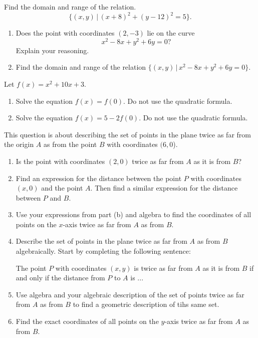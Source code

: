 \documentclass{ximera}
\begin{document}
\begin{question} \label{Q2mvem3}
Find the domain and range of the relation.
\[
\{ (x,y) \, | \, (x+8)^2 + (y-12)^2 = 5 \}.
\]
\end{question}

\begin{question} \label{Qv0efef}
\begin{enumerate}
\item Does the point with coordinates $(2,-3)$ lie on the curve
\[
      x^2 - 8x + y^2 +6y = 0?
\]
Explain your reasoning.

\item Find the domain and range of the relation $\{ (x,y) \, | \, x^2 - 8x + y^2 +6y = 0 \}$.
\end{enumerate}
\end{question}

\begin{question} \label{Q0v9efefm}
Let $f(x) = x^2 + 10x + 3$.

\begin{enumerate}
\item Solve the equation $f(x) = f(0)$. Do not use the quadratic formula.

\item Solve the equation $f(x)=5-2f(0)$. Do not use the quadratic formula.

\end{enumerate} 
\end{question}

\begin{question} \label{Qfefef}
This question is about describing the set of points in the plane twice as far from the origin $A$ as from the point $B$ with coordinates $(6,0$).

\begin{enumerate}
\item Is the point with coordinates $(2,0)$ twice as far from $A$ as it is from $B$?

\item Find an expression for the distance between the point $P$ with coordinates $(x,0)$ and the point $A$. Then find a similar expression for the distance between $P$ and $B$.

\item Use your expressions from part (b) and algebra to find the coordinates of all points on the $x$-axis twice as far from $A$ as from $B$.

\item Describe the set of points in the plane twice as far from $A$ as from $B$ algebraically. Start by completing the following sentence:


The point $P$ with coordinates $(x,y)$ is twice as far from $A$ as it is from $B$ if and only if the distance from $P$ to $A$ is ...


\item Use algebra and your algebraic description of the set of points twice as far from $A$ as from $B$ to find a geometric description of tihs same set. 

\item Find the exact coordinates of all points on the $y$-axis twice as far from $A$ as from $B$.
\end{enumerate}
\end{question}
\end{document}
